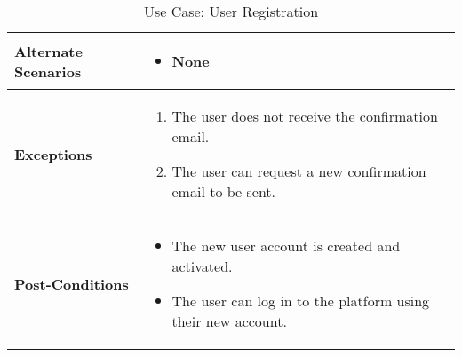 \begin{table}[!ht]
\begin{tabularx}{\textwidth}{|l|X|}
        \hline
        \textbf{Alternate Scenarios} & 
        \begin{itemize}[label=--,itemsep=0pt]
            \item None
        \end{itemize} \\
        \hline
        \textbf{Exceptions} & 
        \begin{enumerate}[label=\arabic*.,itemsep=0pt]
            \item The user does not receive the confirmation email.
            \item The user can request a new confirmation email to be sent.
        \end{enumerate} \\
        \hline
        \textbf{Post-Conditions} & 
        \begin{itemize}[label=--,itemsep=0pt]
            \item The new user account is created and activated.
            \item The user can log in to the platform using their new account.
        \end{itemize} \\
        \hline
    \end{tabularx}
    \caption{Use Case: User Registration}
    \label{tab:use-case-user-registration}
\end{table}


